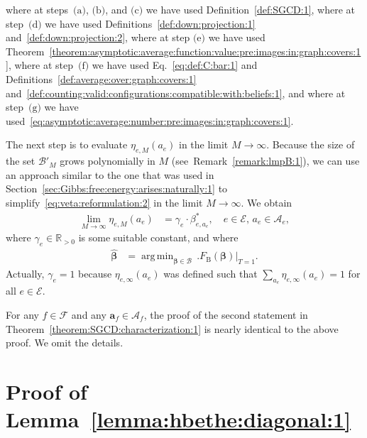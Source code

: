 \documentclass[journal, twocolumn]{IEEEtran}
\renewcommand{\mathbf}[1]{{\bm{#1}}}
\newcommand{\Rpp}{\mathbb{R}_{>0}}
\newcommand{\vect}[1]{\mathbf{#1}}
\newcommand{\set}[1]{\mathcal{#1}}
\DeclareMathOperator*{\argmin}{arg\,min}
\newcommand{\onestar}{\text{(a)}}
\newcommand{\twostars}{\text{(b)}}
\newcommand{\threestars}{\text{(c)}}
\newcommand{\fourstars}{\text{(d)}}
\newcommand{\fivestars}{\text{(e)}}
\newcommand{\sixstars}{\text{(f)}}
\newcommand{\sevenstars}{\text{(g)}}
\newcommand{\bel}{\beta}
\newcommand{\bels}{\bel^{*}}
\newcommand{\vbel}{\boldsymbol{\bel}}
\newcommand{\hvbel}{\boldsymbol{\hat \bel}}
\newcommand{\setA}{\set{A}}
\newcommand{\setE}{\set{E}}
\newcommand{\setF}{\set{F}}
\newcommand{\va}{\vect{a}}
\newcommand{\lmpB}{\mathcal{B}}
\newcommand{\lmpBdown}[1]{\mathcal{B}'_{#1}}
\newcommand{\FBethe}{F_{\mathrm{B}}}
\newcommand{\?}{\mathrm{?}}
\begin{document}
where at steps~$\onestar$, $\twostars$, and $\threestars$ we have used
Definition~\ref{def:SGCD:1}, where at step~$\fourstars$ we have used
Definitions~\ref{def:down:projection:1} and~\ref{def:down:projection:2}, where
at step $\fivestars$ we have used
Theorem~\ref{theorem:asymptotic:average:function:value:pre:images:in:graph:covers:1},
where at step~$\sixstars$ we have used Eq.~\eqref{eq:def:C:bar:1} and
Definitions~\ref{def:average:over:graph:covers:1}
and~\ref{def:counting:valid:configurations:compatible:with:beliefs:1}, and
where at step~$\sevenstars$ we have
used~\eqref{eq:asymptotic:average:number:pre:images:in:graph:covers:1}.

The next step is to evaluate $\eta_{e,M}(a_e)$ in the limit $M \to
\infty$. Because the size of the set $\lmpBdown{M}$ grows polynomially in $M$
(see~Remark~\ref{remark:lmpB:1}), we can use an approach similar to the one
that was used in Section~\ref{sec:Gibbs:free:energy:arises:naturally:1} to
simplify~\eqref{eq:veta:reformulation:2} in the limit $M \to \infty$.  We
obtain
\begin{align*}
  \lim_{M \to \infty}
    \eta_{e,M}(a_e)
    &= \gamma_e
       \cdot
       \bels_{e,a_e},
         \quad e \in \setE, \, a_e \in \setA_e,
\end{align*}
where $\gamma_e \in \Rpp$ is some suitable constant, and where
\begin{align*}
  \hvbel
    &= \argmin_{\vbel \in \lmpB} \,
         \Big.
           \FBethe(\vbel)
         \Big|_{T = 1}.
\end{align*}
Actually, $\gamma_e = 1$ because $\eta_{e,\infty}(a_e)$ was defined such that
$\sum_{a_e} \eta_{e,\infty}(a_e) = 1$ for all $e \in \setE$.

For any $f \in \setF$ and any $\va_f \in \setA_f$, the proof of the second
statement in Theorem~\ref{theorem:SGCD:characterization:1} is nearly identical
to the above proof. We omit the details.


\section{Proof of Lemma~\ref{lemma:hbethe:diagonal:1}}
\label{sec:proof:lemma:hbethe:diagonal:1}
\end{document}
